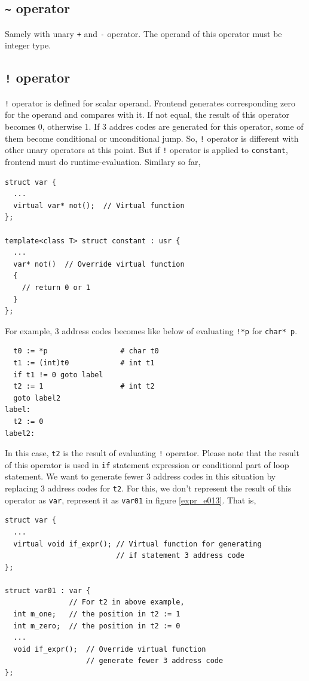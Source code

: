 \subsection{{\tt{\~{}}} operator}

Samely with unary {\tt{+}} and {\tt{-}} operator.
The operand of this operator must be integer type.

\subsection{{\tt{!}} operator}
\label{expr_e016}
{\tt{!}} operator is defined for scalar operand. Frontend generates
corresponding zero for the operand and compares with it. If not equal,
the result of this operator becomes 0, otherwise 1. If 3 addres codes
are generated for this operator, some of them become conditional or 
unconditional jump. So, {\tt{!}} operator is different with other unary
operators at this point. But if {\tt{!}} operator is applied to
{\tt{constant}}, frontend must do runtime-evaluation. Similary so far,
\begin{verbatim}
struct var {
  ...
  virtual var* not();  // Virtual function
};

template<class T> struct constant : usr {
  ...
  var* not()  // Override virtual function
  {
    // return 0 or 1
  }
};
\end{verbatim}
For example, 3 address codes becomes like below
of evaluating {\tt{!*p}} for {\tt{char* p}}.
\begin{verbatim}
  t0 := *p                 # char t0
  t1 := (int)t0            # int t1
  if t1 != 0 goto label
  t2 := 1                  # int t2
  goto label2
label:
  t2 := 0
label2:
\end{verbatim}
In this case, {\tt{t2}} is the result of evaluating {\tt{!}} operator.
Please note that the result of this operator is used in
{\tt{if}} statement expression or conditional part of loop statement.
We want to generate fewer 3 address codes in this situation
by replacing 3 address codes for {\tt{t2}}.
For this, we don't represent the result of this operator as {\tt{var}},
represent it as {\tt{var01}} in figure \ref{expr_e013}. That is,
\begin{verbatim}
struct var {
  ...
  virtual void if_expr(); // Virtual function for generating
                          // if statement 3 address code
};

struct var01 : var {
               // For t2 in above example,
  int m_one;   // the position in t2 := 1
  int m_zero;  // the position in t2 := 0
  ...
  void if_expr();  // Override virtual function
                   // generate fewer 3 address code
};
\end{verbatim}
